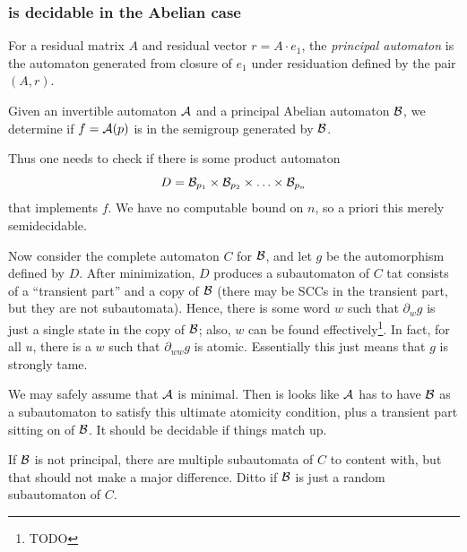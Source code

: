 \documentclass[11pt]{article}
\begin{document}
\begin{example}
\begin{center}
\end{center}
\end{example}

\subsubsection{ is decidable in the Abelian case}

\begin{definition}
  For a residual matrix $A$ and residual vector $r = A \cdot e_1$, the
  \emph{principal automaton} is the automaton generated from closure
  of $e_1$ under residuation defined by the pair $(A, r)$.
\end{definition}

{\color{TODO}
Given an invertible automaton $\mathcal{A}$ and a principal Abelian automaton
$\mathcal{B}$, we determine if $f = \mathcal{A}(p)$ is in the semigroup generated by $\mathcal{B}$.

Thus one needs to check if there is some product automaton
\[
  D = \mathcal{B}_{p_1} \times \mathcal{B}_{p_2} \times \ldots \times \mathcal{B}_{p_n}
\]
that implements $f$. We have no computable bound on $n$, so a priori
this merely semidecidable.

Now consider the complete automaton $C$ for $\mathcal{B}$, and let $g$ be the
automorphism defined by $D$. After minimization, $D$ produces a
subautomaton of $C$ tat consists of a ``transient part'' and a copy of
$\mathcal{B}$ (there may be SCCs in the transient part, but they are not
subautomata). Hence, there is some word $w$ such that $\partial_w g$
is just a single state in the copy of $\mathcal{B}$; also, $w$ can be found
effectively\footnote{TODO}. In fact, for all $u$, there is a $w$ such
that $\partial_{ww}g$ is atomic. Essentially this just means that $g$
is strongly tame.

We may safely assume that $\mathcal{A}$ is minimal. Then is looks like $\mathcal{A}$ has
to have $\mathcal{B}$ as a subautomaton to satisfy this ultimate atomicity
condition, plus a transient part sitting on of $\mathcal{B}$. It should be
decidable if things match up.

If $\mathcal{B}$ is not principal, there are multiple subautomata of $C$ to
content with, but that should not make a major difference. Ditto if
$\mathcal{B}$ is just a random subautomaton of $C$.

%
}
\end{document}
